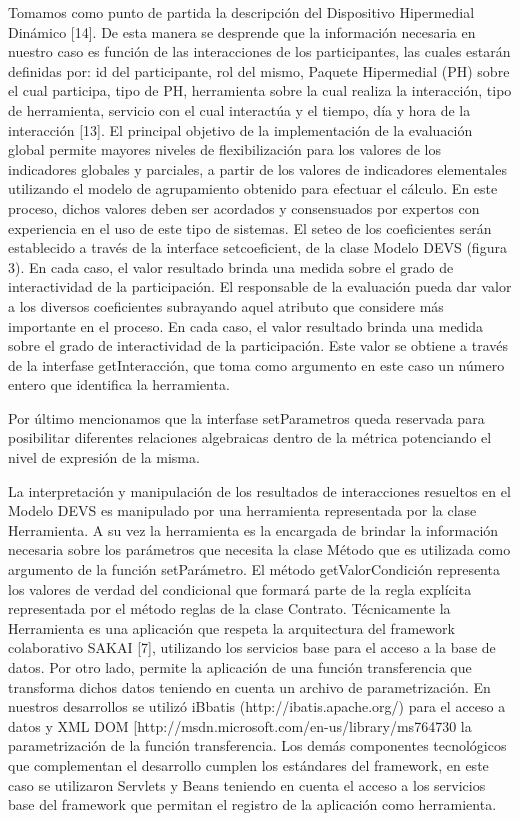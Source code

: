Tomamos como punto de partida la descripción del Dispositivo Hipermedial
Dinámico [14]. De esta manera se desprende que la información necesaria en
nuestro caso es función de las interacciones de los participantes, las cuales
estarán definidas por: id del participante, rol del mismo, Paquete Hipermedial
(PH) sobre el cual participa, tipo de PH, herramienta sobre la cual realiza la
interacción, tipo de herramienta, servicio con el cual interactúa y el tiempo,
día y hora de la interacción [13].
El principal objetivo de la implementación de la evaluación global permite
mayores niveles de flexibilización para los valores de los indicadores globales
y parciales, a partir de los valores de indicadores elementales utilizando el
modelo de agrupamiento obtenido para efectuar el cálculo. En este proceso,
dichos valores deben ser acordados y consensuados por expertos con experiencia
en el uso de este tipo de sistemas. El seteo de los coeficientes serán
establecido a través de la interface setcoeficient, de la clase Modelo DEVS
(figura 3). En cada caso, el valor resultado brinda una medida sobre el grado de
interactividad de la participación. El responsable de la evaluación pueda dar
valor a los diversos coeficientes subrayando aquel atributo que considere más
importante en el proceso. En cada caso, el valor resultado brinda una medida
sobre el grado de interactividad de la participación. Este valor se obtiene a
través de la interfase getInteracción, que toma como argumento en este caso un
número entero que identifica la herramienta.

Por último mencionamos que la interfase setParametros queda reservada para
posibilitar diferentes relaciones algebraicas dentro de la métrica potenciando
el nivel de expresión de la misma.

La interpretación y manipulación de los resultados de interacciones resueltos en
el Modelo DEVS es manipulado por una herramienta representada por la clase
Herramienta. A su vez la herramienta es la encargada de brindar la información
necesaria sobre los parámetros que necesita la clase Método que es utilizada
como argumento de la función setParámetro. El método getValorCondición
representa los valores de verdad del condicional que formará parte de la regla
explícita representada por el método reglas de la clase Contrato.
Técnicamente la Herramienta es una aplicación que respeta la arquitectura del
framework colaborativo SAKAI [7], utilizando los servicios base para el acceso a
la base de datos. Por otro lado,  permite la aplicación de una función
transferencia que transforma dichos datos teniendo en cuenta un archivo de
parametrización. En nuestros desarrollos se utilizó iBbatis
(http://ibatis.apache.org/) para el acceso a datos y XML DOM
[http://msdn.microsoft.com/en-us/library/ms764730%
la parametrización de la función transferencia. Los demás componentes
tecnológicos que complementan el desarrollo cumplen los estándares del
framework, en este caso se utilizaron Servlets y Beans teniendo en cuenta el
acceso a los servicios base del framework que permitan el registro de la
aplicación como herramienta.

